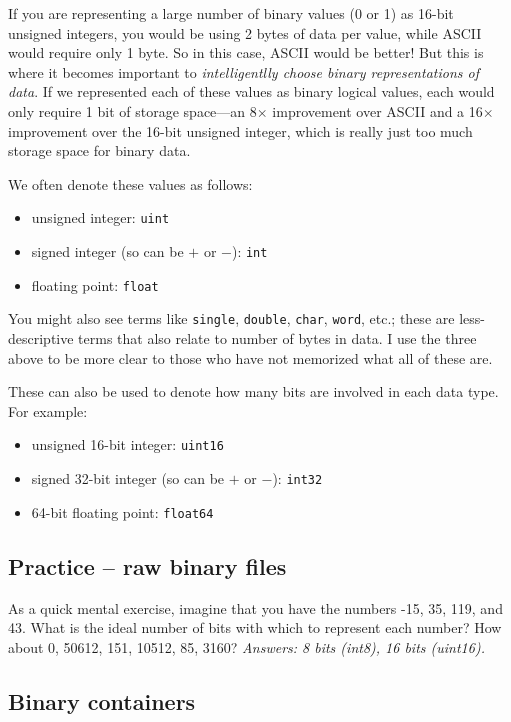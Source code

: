 \documentclass[a4paper,10pt]{scrartcl}
\begin{document}
If you are representing a large number of binary values (0 or 1) as 16-bit unsigned integers, you would be using 2 bytes of data per value, while ASCII would require only 1 byte. So in this case, ASCII would be better! But this is where it becomes important to \textit{intelligentlly choose binary representations of data}. If we represented each of these values as binary logical values, each would only require 1 bit of storage space---an 8$\times$ improvement over ASCII and a 16$\times$ improvement over the 16-bit unsigned integer, which is really just too much storage space for binary data.

We often denote these values as follows:
\begin{itemize}
 \item unsigned integer: \lstinline{uint}
 \item signed integer (so can be $+$ or $-$): \lstinline{int}
 \item floating point: \lstinline{float}
\end{itemize}

You might also see terms like  \lstinline{single}, \lstinline{double}, \lstinline{char}, \lstinline{word}, etc.; these are less-descriptive terms that also relate to number of bytes in data. I use the three above to be more clear to those who have not memorized what all of these are.

These can also be used to denote how many bits are involved in each data type. For example:
\begin{itemize}
 \item unsigned 16-bit integer: \lstinline{uint16}
 \item signed 32-bit integer (so can be $+$ or $-$): \lstinline{int32}
 \item 64-bit floating point: \lstinline{float64}
\end{itemize}

\subsection{Practice -- raw binary files}



As a quick mental exercise, imagine that you have the numbers -15, 35, 119, and 43. What is the ideal number of bits with which to represent each number? How about 0, 50612, 151, 10512, 85, 3160? \textit{Answers: 8 bits (int8), 16 bits (uint16).}

\subsection{Binary containers}
\end{document}

